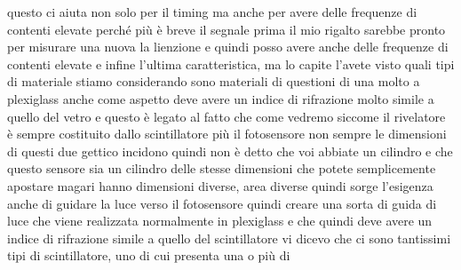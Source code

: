 {questo ci aiuta non solo per il timing ma anche per avere delle frequenze di contenti elevate perché più è breve il segnale prima il mio rigalto sarebbe pronto per misurare una nuova la lienzione e quindi posso avere anche delle frequenze di contenti elevate e infine l'ultima caratteristica, ma lo capite l'avete visto quali tipi di materiale stiamo considerando sono materiali di questioni di una molto a plexiglass anche come aspetto deve avere un indice di rifrazione molto simile a quello del vetro e questo è legato al fatto che come vedremo siccome il rivelatore è sempre costituito dallo scintillatore più il fotosensore non sempre le dimensioni di questi due gettico incidono quindi non è detto che voi abbiate un cilindro e che questo sensore sia un cilindro delle stesse dimensioni che potete semplicemente apostare magari hanno dimensioni diverse, area diverse quindi sorge l'esigenza anche di guidare la luce verso il fotosensore quindi creare una sorta di guida di luce che viene realizzata normalmente in plexiglass e che quindi deve avere un indice di rifrazione simile a quello del scintillatore vi dicevo che ci sono tantissimi tipi di scintillatore, uno di cui presenta una o più di 

}

